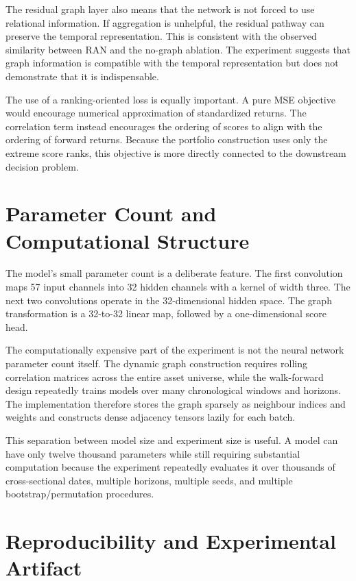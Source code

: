 \documentclass[10pt]{article}
\begin{document}
The residual graph layer also means that the network is not forced to use relational information. If aggregation is unhelpful, the residual pathway can preserve the temporal representation. This is consistent with the observed similarity between RAN and the no-graph ablation. The experiment suggests that graph information is compatible with the temporal representation but does not demonstrate that it is indispensable.

The use of a ranking-oriented loss is equally important. A pure MSE objective would encourage numerical approximation of standardized returns. The correlation term instead encourages the ordering of scores to align with the ordering of forward returns. Because the portfolio construction uses only the extreme score ranks, this objective is more directly connected to the downstream decision problem.

\section{Parameter Count and Computational Structure}

The model's small parameter count is a deliberate feature. The first convolution maps 57 input channels into 32 hidden channels with a kernel of width three. The next two convolutions operate in the 32-dimensional hidden space. The graph transformation is a 32-to-32 linear map, followed by a one-dimensional score head.

The computationally expensive part of the experiment is not the neural network parameter count itself. The dynamic graph construction requires rolling correlation matrices across the entire asset universe, while the walk-forward design repeatedly trains models over many chronological windows and horizons. The implementation therefore stores the graph sparsely as neighbour indices and weights and constructs dense adjacency tensors lazily for each batch.

This separation between model size and experiment size is useful. A model can have only twelve thousand parameters while still requiring substantial computation because the experiment repeatedly evaluates it over thousands of cross-sectional dates, multiple horizons, multiple seeds, and multiple bootstrap/permutation procedures.

\section{Reproducibility and Experimental Artifact}
\end{document}
